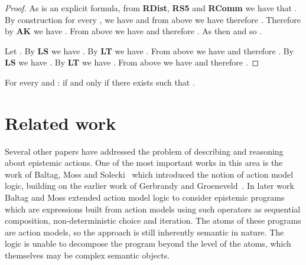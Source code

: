 \documentclass[twoside]{aiml14}
\begin{document}
\begin{proof}
      As  is an explicit formula, from {\bf RDist}, {\bf RS5} and {\bf RComm} we have that
      .
      By construction for every ,  
      we have  
      and from above we have  
      therefore .
      Therefore by {\bf AK} we have .
      From above we have 
      and therefore .
      As  then  
      and so .

      Let .
      By {\bf LS} we have .
      By {\bf LT} we have .
      From above we have 
      and therefore .
      By {\bf LS} we have .
      By {\bf LT} we have .
      From above we have 
      and therefore .
  \end{proof}

  \begin{corollary}
      For every  and : 
       if and only if 
      there exists  
      such that .
  \end{corollary}

  \section{Related work}\label{related-work}

  Several other papers have addressed the problem of describing and reasoning
  about epistemic actions.  One of the most important works in this area is the
  work of Baltag, Moss and Solecki~\cite{baltag1998} which introduced the
  notion of action model logic, building on the earlier work of Gerbrandy and
  Groeneveld~\cite{gerbrandy1997}. In later work Baltag and Moss extended
  action model logic to consider epistemic programs~\cite{baltag2005} which are
  expressions built from action models using such operators as sequential
  composition, non-deterministic choice and iteration. The atoms of these
  programs are action models, so the approach is still inherently semantic in
  nature. The logic is unable to decompose the program beyond the level of the
  atoms, which themselves may be complex semantic objects.
  
\end{document}
